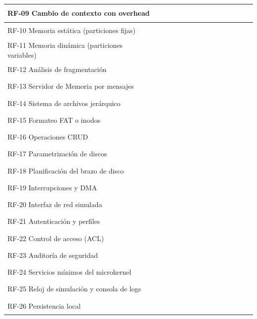 \documentclass[conference]{IEEEtran}
\begin{document}
\begin{table}[!t]
\begin{tabular}{|p{5.8cm}|c|c|c|c|c|c|c|c|c|c|c|c|c|c|}
RF-09 Cambio de contexto con overhead &  & \rule{3.2pt}{3.2pt} &  &  &  &  &  &  &  &  &  &  &  & \\ \hline
RF-10 Memoria estática (particiones fijas) &  &  &  &  & \rule{3.2pt}{3.2pt} &  &  &  &  &  &  &  &  & \\ \hline
RF-11 Memoria dinámica (particiones variables) &  &  &  &  & \rule{3.2pt}{3.2pt} & \rule{3.2pt}{3.2pt} &  &  &  &  &  &  &  & \\ \hline
RF-12 Análisis de fragmentación &  &  &  &  &  & \rule{3.2pt}{3.2pt} &  &  &  &  &  &  &  & \\ \hline
RF-13 Servidor de Memoria por mensajes &  &  &  &  & \rule{3.2pt}{3.2pt} & \rule{3.2pt}{3.2pt} &  &  &  &  &  &  &  & \\ \hline
RF-14 Sistema de archivos jerárquico &  &  &  &  &  &  & \rule{3.2pt}{3.2pt} &  &  &  &  &  &  & \\ \hline
RF-15 Formateo FAT o inodos &  &  &  &  &  &  &  & \rule{3.2pt}{3.2pt} &  &  &  &  &  & \\ \hline
RF-16 Operaciones CRUD &  &  &  &  &  &  & \rule{3.2pt}{3.2pt} &  &  &  &  &  &  & \\ \hline
RF-17 Parametrización de discos &  &  &  &  &  &  &  &  & \rule{3.2pt}{3.2pt} &  &  &  &  & \\ \hline
RF-18 Planificación del brazo de disco &  &  &  &  &  &  &  &  & \rule{3.2pt}{3.2pt} &  &  &  &  & \\ \hline
RF-19 Interrupciones y DMA &  &  &  &  &  &  &  &  &  & \rule{3.2pt}{3.2pt} &  &  &  & \\ \hline
RF-20 Interfaz de red simulada &  &  &  &  &  &  &  &  &  &  & \rule{3.2pt}{3.2pt} &  &  & \\ \hline
RF-21 Autenticación y perfiles &  &  &  &  &  &  &  &  &  &  &  & \rule{3.2pt}{3.2pt} &  & \\ \hline
RF-22 Control de acceso (ACL) & \rule{3.2pt}{3.2pt} &  &  &  &  &  & \rule{3.2pt}{3.2pt} & \rule{3.2pt}{3.2pt} &  &  &  &  & \rule{3.2pt}{3.2pt} & \\ \hline
RF-23 Auditoría de seguridad &  &  &  &  &  &  &  &  &  & \rule{3.2pt}{3.2pt} &  & \rule{3.2pt}{3.2pt} & \rule{3.2pt}{3.2pt} & \rule{3.2pt}{3.2pt}\\ \hline
RF-24 Servicios mínimos del microkernel & \rule{3.2pt}{3.2pt} &  & \rule{3.2pt}{3.2pt} &  & \rule{3.2pt}{3.2pt} &  &  &  &  &  &  &  &  & \\ \hline
RF-25 Reloj de simulación y consola de logs &  & \rule{3.2pt}{3.2pt} & \rule{3.2pt}{3.2pt} &  &  &  &  &  &  &  &  &  &  & \\ \hline
RF-26 Persistencia local &  &  &  &  &  &  &  & \rule{3.2pt}{3.2pt} & \rule{3.2pt}{3.2pt} &  &  & \rule{3.2pt}{3.2pt} &  & \rule{3.2pt}{3.2pt}\\ \hline
\end{tabular}
\end{table}
\end{document}
